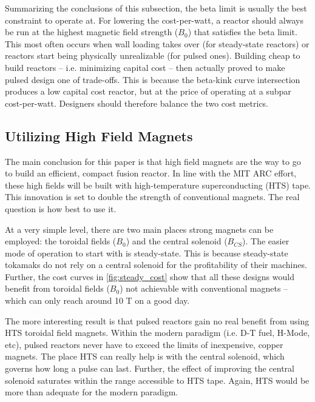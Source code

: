 Summarizing the conclusions of this subsection, the beta limit is usually the best constraint to operate at. For lowering the cost-per-watt, a reactor should always be run at the highest magnetic field strength ($B_0$) that satisfies the beta limit. This most often occurs when wall loading takes over (for steady-state reactors) or reactors start being physically unrealizable (for pulsed ones). Building cheap to build reactors -- i.e. minimizing capital cost -- then actually proved to make pulsed design one of trade-offs. This is because the beta-kink curve intersection produces a low capital cost reactor, but at the price of operating at a subpar cost-per-watt. Designers should therefore balance the two cost metrics.

\subsection{Utilizing High Field Magnets}

The main conclusion for this paper is that high field magnets are the way to go to build an efficient, compact fusion reactor. In line with the MIT ARC effort, these high fields will be built with high-temperature superconducting (HTS) tape. This innovation is set to double the strength of conventional magnets. The real question is how best to use it.

At a very simple level, there are two main places strong magnets can be employed: the toroidal fields ($B_0$) and the central solenoid ($B_{CS}$). The easier mode of operation to start with is steady-state. This is because steady-state tokamaks do not rely on a central solenoid for the profitability of their machines. Further, the cost curves in \cref{fig:steady_cost} show that all these designs would benefit from toroidal fields ($B_0$) not achievable with conventional magnets -- which can only reach around 10 T on a good day.

The more interesting result is that pulsed reactors gain no real benefit from using HTS toroidal field magnets. Within the modern paradigm (i.e. D-T fuel, H-Mode, etc), pulsed reactors never have to exceed the limits of inexpensive, copper magnets. The place HTS can really help is with the central solenoid, which governs how long a pulse can last. Further, the effect of improving the central solenoid saturates within the range accessible to HTS tape. Again, HTS would be more than adequate for the modern paradigm.

